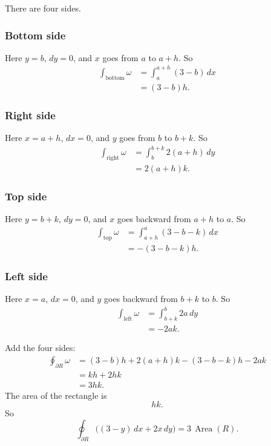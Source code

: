 There are four sides.

\subsubsection*{Bottom side}

Here \(y=b\), \(dy=0\), and \(x\) goes from \(a\) to \(a+h\).  So
\[
\begin{aligned}
\int_{\text{bottom}}\omega
&=
\int_a^{a+h}(3-b)\,dx       \\
&=(3-b)h.
\end{aligned}
\]

\subsubsection*{Right side}

Here \(x=a+h\), \(dx=0\), and \(y\) goes from \(b\) to \(b+k\).  So
\[
\begin{aligned}
\int_{\text{right}}\omega
&=
\int_b^{b+k}2(a+h)\,dy      \\
&=2(a+h)k.
\end{aligned}
\]

\subsubsection*{Top side}

Here \(y=b+k\), \(dy=0\), and \(x\) goes backward from \(a+h\) to \(a\).  So
\[
\begin{aligned}
\int_{\text{top}}\omega
&=
\int_{a+h}^{a}(3-b-k)\,dx   \\
&=-(3-b-k)h.
\end{aligned}
\]

\subsubsection*{Left side}

Here \(x=a\), \(dx=0\), and \(y\) goes backward from \(b+k\) to \(b\).  So
\[
\begin{aligned}
\int_{\text{left}}\omega
&=
\int_{b+k}^{b}2a\,dy        \\
&=-2ak.
\end{aligned}
\]

Add the four sides:
\[
\begin{aligned}
\oint_{\partial R}\omega
&=(3-b)h+2(a+h)k-(3-b-k)h-2ak\\
&=kh+2hk\\
&=3hk.
\end{aligned}
\]
The area of the rectangle is
\[
    hk.
\]
So
\[
\boxed{
    \oint_{\partial R}\bigl((3-y)\,dx+2x\,dy\bigr)
    =3\,\operatorname{Area}(R).
}
\]

